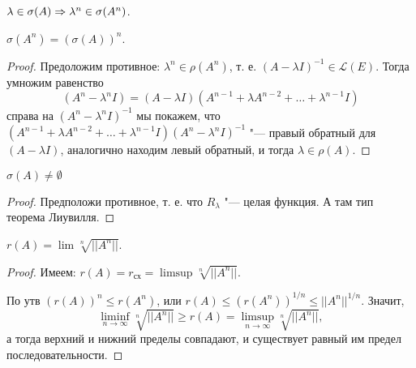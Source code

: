 \documentclass[main]{subfiles}
\begin{document}
\begin{proposition}
  $\lambda \in \sigma(A) \Rightarrow \lambda^n \in \sigma(A^n)$.
\end{proposition}

\begin{exercise}
  $\sigma(A^n) = (\sigma(A))^n $.
\end{exercise}

\begin{proof}
  Предоложим противное: $\lambda^n \in \rho(A^n)$, т. е.
  $(A - \lambda I)^{-1} \in \mathcal{L}(E)$.
  Тогда умножим равенство
  \[ (A^n - \lambda^n I) = (A - \lambda I)
  (A^{n -1} + \lambda A^{n-2} + \dots + \lambda^{n-1} I) \]
  справа на $(A^n - \lambda^n I)^{-1}$ мы покажем, что
  $(A^{n -1} + \lambda A^{n-2} + \dots + \lambda^{n-1} I)(A^n - \lambda^n I)^{-1}$
  "--- правый обратный для $(A - \lambda I)$, аналогично находим левый обратный,
  и тогда $\lambda \in \rho(A)$.
\end{proof}

\begin{proposition}
  $\sigma(A) \ne \emptyset$
\end{proposition}
\begin{proof}
  Предположи противное, т. е. что $R_\lambda$ "--- целая функция.
  А там тип теорема Лиувилля.
\end{proof}

\begin{proposition} %
  $ r(A) = \lim \sqrt[n]{||A^n||} $.
\end{proposition}
\begin{proof}
  Имеем: $r(A)  = r_{\text{сх}} = \limsup \sqrt[n]{||A^n||}$.

  По утв $(r(A))^n \le r(A^n)$, или
  $r(A) \le \left(r(A^n) \right)^{1/n} \le ||A^n||^{1/n}$.
  Значит,
  \[ \liminf_{n \to \infty} \sqrt[n]{||A^n||} \ge r(A) = \limsup_{n \to \infty} \sqrt[n]{||A^n||}, \]
  а тогда верхний и нижний пределы совпадают, и существует равный им предел последовательности.
\end{proof}
 
\end{document}
